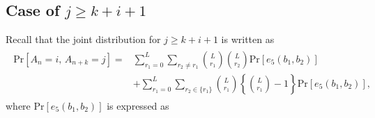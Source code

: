 \subsection{Case of $j \geq k+i+1$}
Recall that the joint distribution for $j \geq k+i+1$ is written as
\begin{align}\begin{split}
  \mathrm{Pr}[A_n=i,\, A_{n+k}=j] 
  =& \sum_{r_1=0}^{L} \sum_{r_2 \neq r_1} \binom{L}{r_1}\binom{L}{r_2}\mathrm{Pr}[e_5(b_1,b_2)] \\
  &+ \sum_{r_1=0}^{L} \sum_{r_2 \in \{r_1\}} \binom{L}{r_1}\left\{\binom{L}{r_1}-1\right\}\mathrm{Pr}[e_5(b_1,b_2)],
\end{split}\end{align}
where $\mathrm{Pr}[e_5(b_1,b_2)]$ is expressed as
